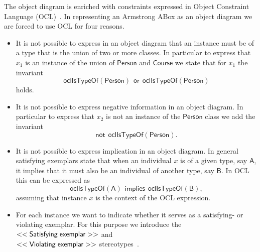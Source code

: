 \documentclass{amsart}
\begin{document}
    
    The object diagram is enriched with constraints expressed in Object Constraint Language (OCL)~\cite{OCL2.4}. In representing an Armstrong ABox as an object diagram we are forced to use OCL for four reasons.
    \begin{itemize}
     \item It is not possible to express in an object diagram that an instance must be of a type that is the union of two or more classes. In particular to express that $x_1$ is an instance of the union of $\mathsf{Person}$ and $\mathsf{Course}$ we state that for $x_1$ the invariant 
     \[\mathsf{oclIsTypeOf}(\mathsf{Person}) \hspace{5pt} \mathsf{or} \hspace{5pt} \mathsf{oclIsTypeOf}(\mathsf{Person})\] 
     holds. 
     \item It is not possible to express  negative information in an object diagram. In particular to express that $x_2$ is not an instance of the $\mathsf{Person}$ class we add the invariant 
     \[\mathsf{not} \hspace{5pt} \mathsf{oclIsTypeOf}(\mathsf{Person}).\]
     \item It is not possible to express implication in an object diagram. In general satisfying exemplars state that when an individual $x$ is of a given type, say $\mathsf{A}$, it implies that it must also be an individual of another type, say $\mathsf{B}$. In OCL this can be expressed as 
     \[\mathsf{oclIsTypeOf}(\mathsf{A}) \hspace{5pt} \mathsf{implies} \hspace{5pt} \mathsf{oclIsTypeOf}(\mathsf{B}),\]
     assuming that instance $x$ is the context of the OCL expression.
     \item For each instance we want to indicate whether it serves as a satisfying- or violating exemplar. For this purpose we introduce the $<<\mathsf{Satisfying \hspace{1mm} exemplar}>>$ and \\$<<\mathsf{Violating \hspace{1mm} exemplar}>>$ stereotypes~\cite{UML2.5.1}.
    \end{itemize}
\end{document}
